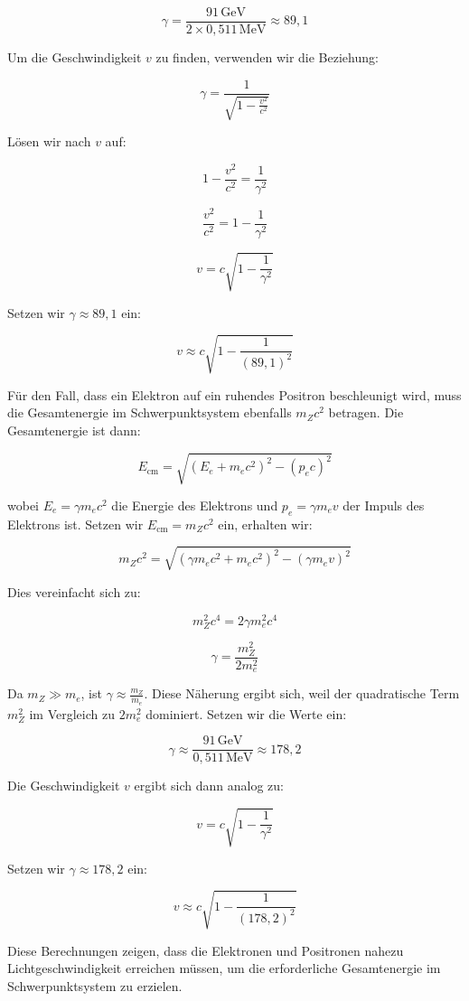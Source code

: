 \documentclass[11pt,a4paper]{article}
\begin{document}
\[
\gamma = \frac{91 \, \text{GeV}}{2 \times 0{,}511 \, \text{MeV}} \approx 89{,}1
\]

Um die Geschwindigkeit \( v \) zu finden, verwenden wir die Beziehung:

\[
\gamma = \frac{1}{\sqrt{1 - \frac{v^2}{c^2}}}
\]

Lösen wir nach \( v \) auf:

\[
1 - \frac{v^2}{c^2} = \frac{1}{\gamma^2}
\]

\[
\frac{v^2}{c^2} = 1 - \frac{1}{\gamma^2}
\]

\[
v = c \sqrt{1 - \frac{1}{\gamma^2}}
\]

Setzen wir \( \gamma \approx 89{,}1 \) ein:

\[
v \approx c \sqrt{1 - \frac{1}{(89{,}1)^2}}
\]

Für den Fall, dass ein Elektron auf ein ruhendes Positron beschleunigt wird, muss die Gesamtenergie im Schwerpunktsystem ebenfalls \( m_Z c^2 \) betragen. Die Gesamtenergie ist dann:

\[
E_{\text{cm}} = \sqrt{(E_e + m_e c^2)^2 - (p_e c)^2}
\]

wobei \( E_e = \gamma m_e c^2 \) die Energie des Elektrons und \( p_e = \gamma m_e v \) der Impuls des Elektrons ist. Setzen wir \( E_{\text{cm}} = m_Z c^2 \) ein, erhalten wir:

\[
m_Z c^2 = \sqrt{(\gamma m_e c^2 + m_e c^2)^2 - (\gamma m_e v)^2}
\]

Dies vereinfacht sich zu:

\[
m_Z^2 c^4 = 2 \gamma m_e^2 c^4
\]

\[
\gamma = \frac{m_Z^2}{2 m_e^2}
\]

Da \( m_Z \gg m_e \), ist \( \gamma \approx \frac{m_Z}{m_e} \). Diese Näherung ergibt sich, weil der quadratische Term \( m_Z^2 \) im Vergleich zu \( 2 m_e^2 \) dominiert. Setzen wir die Werte ein:

\[
\gamma \approx \frac{91 \, \text{GeV}}{0{,}511 \, \text{MeV}} \approx 178{,}2
\]

Die Geschwindigkeit \( v \) ergibt sich dann analog zu:

\[
v = c \sqrt{1 - \frac{1}{\gamma^2}}
\]

Setzen wir \( \gamma \approx 178{,}2 \) ein:

\[
v \approx c \sqrt{1 - \frac{1}{(178{,}2)^2}}
\]

Diese Berechnungen zeigen, dass die Elektronen und Positronen nahezu Lichtgeschwindigkeit erreichen müssen, um die erforderliche Gesamtenergie im Schwerpunktsystem zu erzielen.
\end{document}
